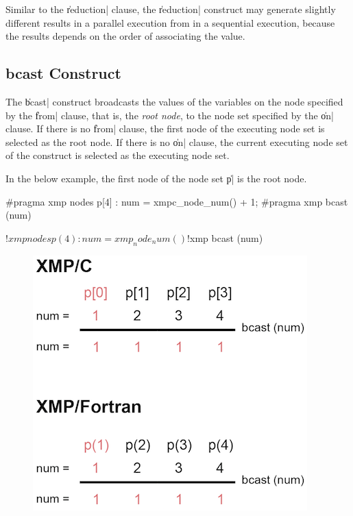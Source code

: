 \begin{mynote}
  Similar to the \|reduction| clause, the \|reduction| construct may
  generate slightly different results in a parallel execution from in a
  sequential execution, because the results depends on the order of
  associating the value.
\end{mynote}


\subsection{{\bf bcast} Construct}

The \|bcast| construct broadcasts the values of the variables on the
node specified by the \|from| clause, that is, the {\it root node}, to
the node set specified by the \|on| clause.
%
If there is no \|from| clause, the first node of the executing node
set is selected as the root node.
%
If there is no \|on| clause, the current executing node set of the
construct is selected as the executing node set.

In the below example, the first node of the node set \|p| is the root
node.

\begin{XCexample}
#pragma xmp nodes p[4]
  :
num = xmpc_node_num() + 1;
#pragma xmp bcast (num)
\end{XCexample}

\begin{XFexample}
!$xmp nodes p(4)
  :
num = xmp_node_num()
!$xmp bcast (num)
\end{XFexample}

\begin{figure}
  \centering
  \includegraphics{figs/bcast.png}
\end{figure}

